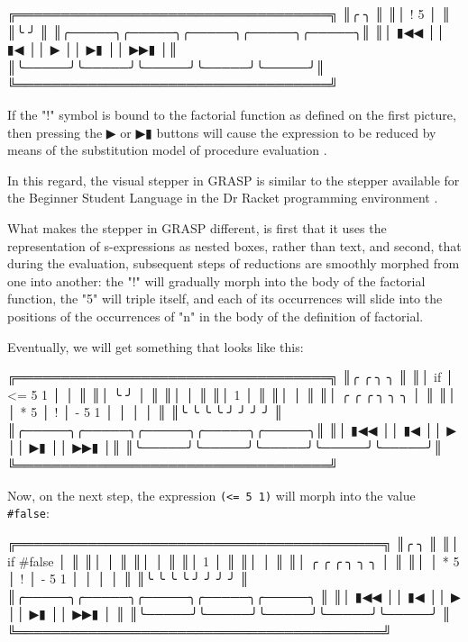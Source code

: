\documentclass[acmsmall]{acmart}
\newenvironment{Snippet}{\Verbatim[samepage=true]}{\endVerbatim}
\begin{document}
\begin{Snippet}
╔═══════════════════════════════════╗
║╭     ╮                            ║
║│ ! 5 │                            ║
║╰     ╯                            ║
║╭─────╮╭─────╮╭─────╮╭─────╮╭─────╮║
║│ ▮◀◀ ││ ▮◀  ││  ▶  ││  ▶▮ ││ ▶▶▮ │║
║╰─────╯╰─────╯╰─────╯╰─────╯╰─────╯║
╚═══════════════════════════════════╝
\end{Snippet}

If the "!" symbol is bound to the factorial function as defined on the
first picture, then pressing the ▶ or ▶▮ buttons will cause the
expression to be reduced by means of the substitution model of
procedure evaluation \cite{SICP}.

In this regard, the visual stepper in GRASP is similar to the stepper
available for the Beginner Student Language in the Dr Racket
programming environment \cite{Clements}.

What makes the stepper in GRASP different, is first that it uses the
representation of s-expressions as nested boxes, rather than text, and
second, that during the evaluation, subsequent steps of reductions are
smoothly morphed from one into another: the "!" will gradually morph
into the body of the factorial function, the "5" will triple itself,
and each of its occurrences will slide into the positions of the
occurrences of "n" in the body of the definition of factorial.

Eventually, we will get something that looks like this:

\begin{Snippet}
╔═══════════════════════════════════╗
║╭    ╭        ╮                 ╮  ║
║│ if │ <= 5 1 │                 │  ║
║│    ╰        ╯                 │  ║
║│                               │  ║
║│       1                       │  ║
║│                               │  ║
║│       ╭     ╭   ╭       ╮ ╮ ╮ │  ║
║│       │ * 5 │ ! │ - 5 1 │ │ │ │  ║
║╰       ╰     ╰   ╰       ╯ ╯ ╯ ╯  ║
║╭─────╮╭─────╮╭─────╮╭─────╮╭─────╮║
║│ ▮◀◀ ││ ▮◀  ││  ▶  ││  ▶▮ ││ ▶▶▮ │║
║╰─────╯╰─────╯╰─────╯╰─────╯╰─────╯║
╚═══════════════════════════════════╝
\end{Snippet}

Now, on the next step, the expression \texttt{(<= 5 1)} will morph into the
value \texttt{\#false}:

\begin{Snippet}
╔═════════════════════════════════════════╗
║╭                               ╮        ║
║│ if #false                     │        ║
║│                               │        ║
║│                               │        ║
║│       1                       │        ║
║│                               │        ║
║│       ╭     ╭   ╭       ╮ ╮ ╮ │        ║
║│       │ * 5 │ ! │ - 5 1 │ │ │ │        ║
║╰       ╰     ╰   ╰       ╯ ╯ ╯ ╯        ║
║╭─────╮╭─────╮╭─────╮╭─────╮╭─────╮      ║
║│ ▮◀◀ ││ ▮◀  ││  ▶  ││  ▶▮ ││ ▶▶▮ │      ║
║╰─────╯╰─────╯╰─────╯╰─────╯╰─────╯      ║
╚═════════════════════════════════════════╝
\end{Snippet}
\end{document}
